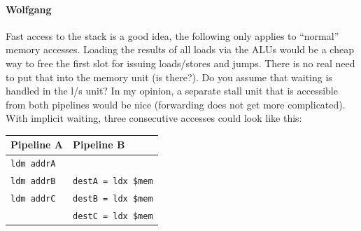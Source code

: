 \documentclass{IEEEtran}
\newcommand{\comment}[3]{\paragraph*{\textbf{#1}}{\color{#3}#2}}
\newcommand{\wolf}[1]{\comment{Wolfgang}{#1}{OliveGreen}}
\begin{document}
\wolf{Fast access to the stack is a good idea, the following only
  applies to ``normal'' memory accesses. Loading the results of all
  loads via the ALUs would be a cheap way to free the first slot for
  issuing loads/stores and jumps. There is no real need to put that
  into the memory unit (is there?). Do you assume that waiting is
  handled in the l/s unit? In my opinion, a separate stall unit that
  is accessible from both pipelines would be nice (forwarding does not
  get more complicated). With implicit waiting, three consecutive
  accesses could look like this:

  \medskip
  \begin{tabular}{ll}
    Pipeline A & Pipeline B \\
    \hline
    \texttt{ldm addrA} & \\
    \texttt{ldm addrB} & \texttt{destA = ldx \$mem} \\
    \texttt{ldm addrC} & \texttt{destB = ldx \$mem} \\
                       & \texttt{destC = ldx \$mem} \\
  \end{tabular}
}
\end{document}
